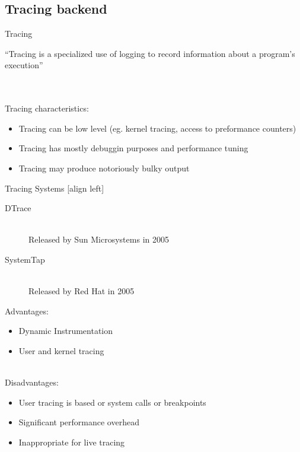 \subsection{Tracing backend}

\begin{frame}{Tracing}
\begin{exampleblock}{}
  {``Tracing is a specialized use of logging to record information about a
program's execution''}
  \vskip5mm
  \hspace*{}
\end{exampleblock}
\hfill \\
\hfill \\
Tracing characteristics:
\begin{itemize}
\item Tracing can be low level (eg. kernel tracing, access to preformance
counters)
\item Tracing has mostly debuggin purposes and performance tuning
\item Tracing may produce notoriously bulky output
\end{itemize}
\end{frame}

\begin{frame}{Tracing Systems}
[align left]
\begin{description}
\item[DTrace] \hfill \\
Released by Sun Microsystems in 2005
\item[SystemTap] \hfill \\
Released by Red Hat in 2005
\end{description}

Advantages:
\begin{itemize}
\item Dynamic Instrumentation
\item User and kernel tracing
\end{itemize}

\hfill \\
Disadvantages:
\begin{itemize}
\item User tracing is based or system calls or breakpoints
\item Significant performance overhead
\item Inappropriate for live tracing
\end{itemize}
\end{frame}

